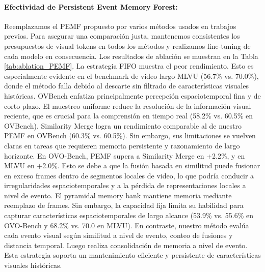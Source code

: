 \paragraph{Efectividad de Persistent Event Memory Forest:}
Reemplazamos el PEMF propuesto por varios métodos usados en trabajos previos. Para asegurar una comparación justa, mantenemos consistentes los presupuestos de visual tokens en todos los métodos y realizamos fine-tuning de cada modelo en consecuencia. Los resultados de ablación se muestran en la Tabla \ref{tab:ablation_PEMF}. La estrategia FIFO muestra el peor rendimiento. Esto es especialmente evidente en el benchmark de video largo MLVU (56.7\% vs. 70.0\%), donde el método falla debido al descarte sin filtrado de características visuales históricas. OVBench enfatiza principalmente percepción espaciotemporal fina y de corto plazo. El muestreo uniforme reduce la resolución de la información visual reciente, que es crucial para la comprensión en tiempo real (58.2\% vs. 60.5\% en OVBench). Similarity Merge logra un rendimiento comparable al de nuestro PEMF en OVBench (60.3\% vs. 60.5\%). Sin embargo, sus limitaciones se vuelven claras en tareas que requieren memoria persistente y razonamiento de largo horizonte. En OVO-Bench, PEMF supera a Similarity Merge en +2.2\%, y en MLVU en +2.0\%. Esto se debe a que la fusión basada en similitud puede fusionar en exceso frames dentro de segmentos locales de video, lo que podría conducir a irregularidades espaciotemporales y a la pérdida de representaciones locales a nivel de evento. El pyramidal memory bank mantiene memoria mediante reemplazo de frames. Sin embargo, la capacidad fija limita su habilidad para capturar características espaciotemporales de largo alcance (53.9\% vs. 55.6\% en OVO-Bench y 68.2\% vs. 70.0 en MLVU). En contraste, nuestro método evalúa cada evento visual según similitud a nivel de evento, conteo de fusiones y distancia temporal. Luego realiza consolidación de memoria a nivel de evento. Esta estrategia soporta un mantenimiento eficiente y persistente de características visuales históricas.




